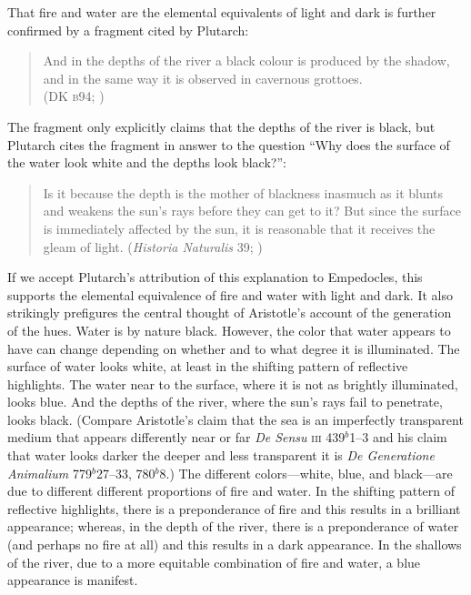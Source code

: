 That fire and water are the elemental equivalents of light and dark is further confirmed by a fragment cited by Plutarch:
\begin{verse}
    And in the depths of the river a black colour is produced by the shadow,\\
    and in the same way it is observed in cavernous grottoes.\\
    (DK \textsc{b}94; \citealt[105 261]{Inwood:2001ve})
\end{verse}
The fragment only explicitly claims that the depths of the river is black, but Plutarch cites the fragment in answer to the question ``Why does the surface of the water look white and the depths look black?'':
\begin{quote}
    Is it because the depth is the mother of blackness inasmuch as it blunts and weakens the sun's rays before they can get to it? But since the surface is immediately affected by the sun, it is reasonable that it receives the gleam of light.  (\emph{Historia Naturalis} 39; \citealt[\textsc{ctxt}-87 137--138]{Inwood:2001ve})
\end{quote}
If we accept Plutarch's attribution of this explanation to Empedocles, this supports the elemental equivalence of fire and water with light and dark. It also strikingly prefigures the central thought of Aristotle's account of the generation of the hues. Water is by nature black. However, the color that water appears to have can change depending on whether and to what degree it is illuminated. The surface of water looks white, at least in the shifting pattern of reflective highlights. The water near to the surface, where it is not as brightly illuminated, looks blue. And the depths of the river, where the sun's rays fail to penetrate, looks black. (Compare Aristotle's claim that the sea is an imperfectly transparent medium that appears differently near or far \emph{De Sensu} \textsc{iii} 439\( ^{b} \)1--3 and his claim that water looks darker the deeper and less transparent it is \emph{De Generatione Animalium} 779\( ^{b} \)27--33, 780\( ^{b} \)8.) The different colors---white, blue, and black---are due to different different proportions of fire and water. In the shifting pattern of reflective highlights, there is a preponderance of fire and this results in a brilliant appearance; whereas, in the depth of the river, there is a preponderance of water (and perhaps no fire at all) and this results in a dark appearance. In the shallows of the river, due to a more equitable combination of fire and water, a blue appearance is manifest.

